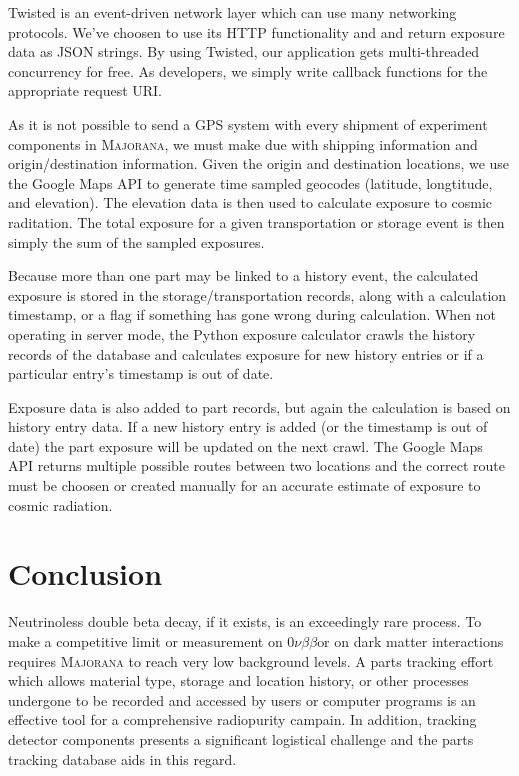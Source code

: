 \documentclass[journal]{IEEEtran}
\def\znbb{0$\nu\beta\beta$}
\begin{document}
Twisted is an event-driven network layer which can use many networking protocols. We've 
choosen to use its HTTP functionality and and return exposure data as JSON strings. By
using Twisted, our application gets multi-threaded concurrency for free. As developers,
we simply write callback functions for the appropriate request URI.

As it is not possible to send a GPS system with every shipment of experiment components
in \textsc{Majorana}, we must make due with shipping information and origin/destination information.
Given the origin and destination locations, we use the Google Maps API to generate time
sampled geocodes (latitude, longtitude, and elevation). The elevation data is then used
to calculate exposure to cosmic raditation. The total exposure for a given
transportation or storage event is then simply the sum of the sampled exposures.

Because more than one part may be linked to a history event, the calculated exposure is
stored in the storage/transportation records, along with a calculation timestamp, or a flag
if something has gone wrong during calculation. When not operating in server mode, the Python
exposure calculator crawls the history records of the database and calculates exposure for
new history entries or if a particular entry's timestamp is out of date. 

Exposure data is also added to part records, but again the calculation is based on history
entry data. If a new history entry is added (or the timestamp is out of date) the part
exposure will be updated on the next crawl. The Google Maps API returns multiple possible
routes between two locations and the correct route must be choosen or created
manually for an accurate estimate of exposure to cosmic radiation.

\section{Conclusion}

Neutrinoless double beta decay, if it exists, is an exceedingly rare process.
To make a competitive limit or measurement on \znbb or on dark matter interactions 
requires \textsc{Majorana} to reach very low background levels. A parts tracking effort which allows material type,
storage and location history, or other processes undergone to be recorded and
accessed by users or computer programs is an effective tool for a comprehensive
radiopurity campain. In addition, tracking detector components presents a significant
logistical challenge and the parts tracking database aids in this regard.
\end{document}
